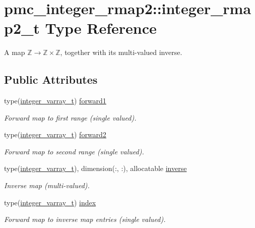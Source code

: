 \hypertarget{structpmc__integer__rmap2_1_1integer__rmap2__t}{}\section{pmc\+\_\+integer\+\_\+rmap2\+:\+:integer\+\_\+rmap2\+\_\+t Type Reference}
\label{structpmc__integer__rmap2_1_1integer__rmap2__t}


A map $\mathbb{Z} \to \mathbb{Z} \times \mathbb{Z}$, together with its multi-\/valued inverse.  


\subsection*{Public Attributes}
\begin{DoxyCompactItemize}
\item 
type(\mbox{\hyperlink{structpmc__integer__varray_1_1integer__varray__t}{integer\+\_\+varray\+\_\+t}}) \mbox{\hyperlink{structpmc__integer__rmap2_1_1integer__rmap2__t_af38ad1ec8549c4893f2a4b66835d476b}{forward1}}
\begin{DoxyCompactList}\small\item\em Forward map to first range (single valued). \end{DoxyCompactList}\item 
type(\mbox{\hyperlink{structpmc__integer__varray_1_1integer__varray__t}{integer\+\_\+varray\+\_\+t}}) \mbox{\hyperlink{structpmc__integer__rmap2_1_1integer__rmap2__t_ab86feff304de6f8984330975d869df4f}{forward2}}
\begin{DoxyCompactList}\small\item\em Forward map to second range (single valued). \end{DoxyCompactList}\item 
type(\mbox{\hyperlink{structpmc__integer__varray_1_1integer__varray__t}{integer\+\_\+varray\+\_\+t}}), dimension(\+:, \+:), allocatable \mbox{\hyperlink{structpmc__integer__rmap2_1_1integer__rmap2__t_a78d779decd5d0e3b31cd33dfea9f51db}{inverse}}
\begin{DoxyCompactList}\small\item\em Inverse map (multi-\/valued). \end{DoxyCompactList}\item 
type(\mbox{\hyperlink{structpmc__integer__varray_1_1integer__varray__t}{integer\+\_\+varray\+\_\+t}}) \mbox{\hyperlink{structpmc__integer__rmap2_1_1integer__rmap2__t_a9d5bd604d5740f0ce3fade5bccba2f8c}{index}}
\begin{DoxyCompactList}\small\item\em Forward map to inverse map entries (single valued). \end{DoxyCompactList}\end{DoxyCompactItemize}


